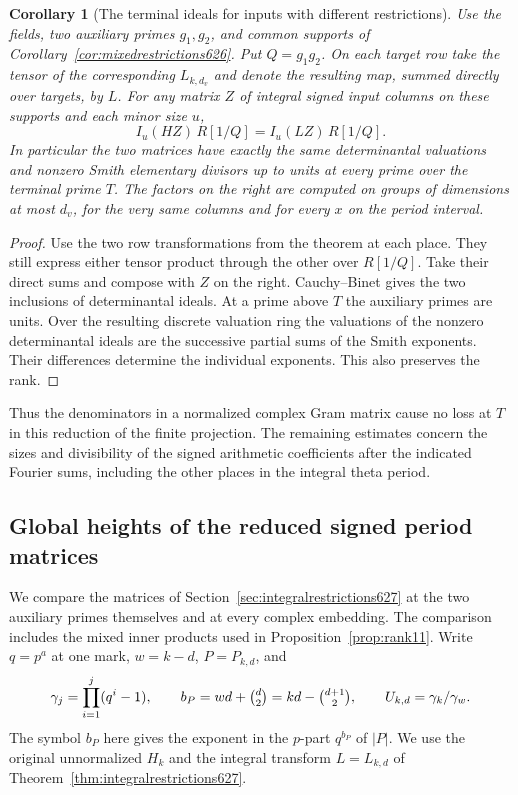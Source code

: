 \documentclass[a4paper,11pt]{article}
\newtheorem{corollary}[proposition]{Corollary}
\theoremstyle{definition}
\theoremstyle{remark}
\numberwithin{equation}{section}
\begin{document}
\begin{corollary}[The terminal ideals for inputs with different restrictions]
\leavevmode\label{cor:integralmixed627}
Use the fields, two auxiliary primes \(g_1,g_2\), and common
supports of Corollary~\ref{cor:mixedrestrictions626}. Put
\(Q=g_1g_2\). On each target row take the tensor of the
corresponding \(L_{k,d_v}\) and denote the resulting map, summed
directly over targets, by \(L\). For any matrix \(Z\) of integral
signed input columns on these supports and each minor size \(u\),
\[
           I_u(HZ)\,R[1/Q]= I_u(LZ)\,R[1/Q].
\]
In particular the two matrices have exactly the same determinantal
valuations and nonzero Smith elementary divisors up to units at
every prime over the terminal prime \(T\). The factors on the
right are computed on groups of dimensions at most \(d_v\), for
the very same columns and for every \(x\) on the period interval.
\end{corollary}
\begin{proof}
Use the two row transformations from the theorem at each place.
They still express either tensor product through the other over
\(R[1/Q]\). Take their direct sums and compose with \(Z\) on the
right. Cauchy--Binet gives the two inclusions of determinantal
ideals. At a prime above \(T\) the auxiliary primes are units.
Over the resulting discrete valuation ring the valuations of
the nonzero determinantal ideals are the successive partial
sums of the Smith exponents. Their differences determine the
individual exponents. This also preserves the rank.
\end{proof}

Thus the denominators in a normalized complex Gram matrix cause
no loss at \(T\) in this reduction of the finite projection. The
remaining estimates concern the sizes and divisibility of the
signed arithmetic coefficients after the indicated Fourier sums,
including the other places in the integral theta period.


\subsection{Global heights of the reduced signed period matrices}
\label{sec:reducedheights628}

We compare the matrices of Section~\ref{sec:integralrestrictions627}
at the two auxiliary primes themselves and at every complex embedding.
The comparison includes the mixed inner products used in
Proposition~\ref{prop:rank11}. Write \(q=p^a\) at one mark,
\(w=k-d\), \(P=P_{k,d}\), and
\[
 \gamma_j=\prod_{i=1}^j(q^i-1),\qquad
 b_P=wd+\tbinom d2=kd-\tbinom{d+1}2,\qquad
 U_{k,d}=\gamma_k/\gamma_w .
\]
The symbol \(b_P\) here gives the exponent in the \(p\)-part
\(q^{b_P}\) of \(|P|\). We use the original unnormalized
\(H_k\) and the integral transform \(L=L_{k,d}\) of
Theorem~\ref{thm:integralrestrictions627}.
\end{document}
